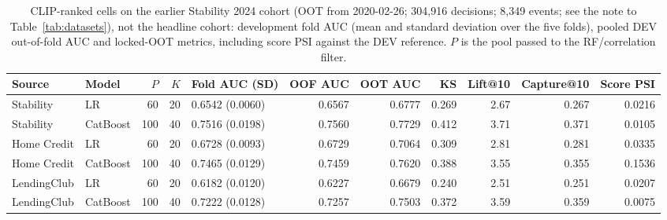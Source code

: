 \documentclass[final,5p,twocolumn]{elsarticle}
\newcommand{\Kfeat}{K}
\begin{document}
\begin{table}[htbp]
\centering
\footnotesize
\begin{threeparttable}
\caption{CLIP-ranked cells on the earlier Stability 2024 cohort (OOT from 2020-02-26; 304,916 decisions; 8,349 events; see the note to Table~\ref{tab:datasets}), not the headline cohort: development fold AUC (mean and standard deviation over the five folds), pooled DEV out-of-fold AUC and locked-OOT metrics, including score PSI against the DEV reference. $P$ is the pool passed to the RF/correlation filter.}
\label{tab:clip_cells}
\begin{tabular}{@{}llrrlrrrrrr@{}}
\toprule
Source & Model & $P$ & $\Kfeat$ & Fold AUC (SD) & OOF AUC & OOT AUC & KS & Lift@10 & Capture@10 & Score PSI \\
\midrule
Stability & LR & 60 & 20 & 0.6542 (0.0060) & 0.6567 & 0.6777 & 0.269 & 2.67 & 0.267 & 0.0216 \\
Stability & CatBoost & 100 & 40 & 0.7516 (0.0198) & 0.7560 & 0.7729 & 0.412 & 3.71 & 0.371 & 0.0105 \\
Home Credit & LR & 60 & 20 & 0.6728 (0.0093) & 0.6729 & 0.7064 & 0.309 & 2.81 & 0.281 & 0.0335 \\
Home Credit & CatBoost & 100 & 40 & 0.7465 (0.0129) & 0.7459 & 0.7620 & 0.388 & 3.55 & 0.355 & 0.1536 \\
LendingClub & LR & 60 & 20 & 0.6182 (0.0120) & 0.6227 & 0.6679 & 0.240 & 2.51 & 0.251 & 0.0207 \\
LendingClub & CatBoost & 100 & 40 & 0.7222 (0.0128) & 0.7257 & 0.7503 & 0.372 & 3.59 & 0.359 & 0.0075 \\
\bottomrule
\end{tabular}
\end{threeparttable}
\end{table}
\end{document}

